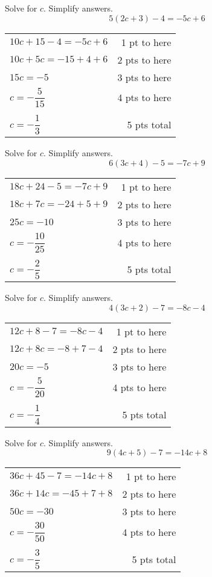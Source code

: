 {
	Solve for $c$. Simplify answers. $$5(2c+3)-4=-5c+6$$
}
{
	\begin{tabular}{l r}
	$10c+15-4=-5c+6$ & 1 pt to here\\
	$10c+5c=-15+4+6$ & 2 pts to here\\
	$15c=-5$ & 3 pts to here\\
	$c=-\dfrac{5}{15}$ & 4 pts to here\\ \\
	$c=-\dfrac{1}{3}$ & 5 pts total\\
	\end{tabular}
}

{
	Solve for $c$. Simplify answers. $$6(3c+4)-5=-7c+9$$
}
{
	\begin{tabular}{l r}
	$18c+24-5=-7c+9$ & 1 pt to here\\
	$18c+7c=-24+5+9$ & 2 pts to here\\
	$25c=-10$ & 3 pts to here\\
	$c=-\dfrac{10}{25}$ & 4 pts to here\\ \\
	$c=-\dfrac{2}{5}$ & 5 pts total\\
	\end{tabular}
}

{
	Solve for $c$. Simplify answers. $$4(3c+2)-7=-8c-4$$
}
{
	\begin{tabular}{l r}
	$12c+8-7=-8c-4$ & 1 pt to here\\
	$12c+8c=-8+7-4$ & 2 pts to here\\
	$20c=-5$ & 3 pts to here\\
	$c=-\dfrac{5}{20}$ & 4 pts to here\\ \\
	$c=-\dfrac{1}{4}$ & 5 pts total\\
	\end{tabular}
}

{
	Solve for $c$. Simplify answers. $$9(4c+5)-7=-14c+8$$
}
{
	\begin{tabular}{l r}
	$36c+45-7=-14c+8$ & 1 pt to here\\
	$36c+14c=-45+7+8$ & 2 pts to here\\
	$50c=-30$ & 3 pts to here\\
	$c=-\dfrac{30}{50}$ & 4 pts to here\\ \\
	$c=-\dfrac{3}{5}$ & 5 pts total\\
	\end{tabular}
}